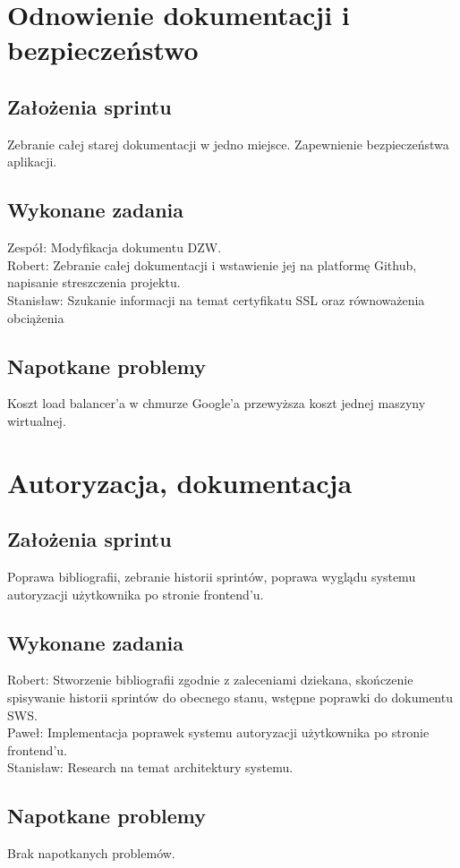 \documentclass[a4paper,11pt]{report}
\begin{document}
\section {Odnowienie dokumentacji i bezpieczeństwo}
\subsection {Założenia sprintu}
Zebranie całej starej dokumentacji w jedno miejsce. Zapewnienie bezpieczeństwa aplikacji.  
\subsection {Wykonane zadania}
Zespół: Modyfikacja dokumentu DZW.\\
Robert: Zebranie całej dokumentacji i wstawienie jej na platformę Github, napisanie streszczenia projektu.\\
Stanisław: Szukanie informacji na temat certyfikatu SSL oraz równoważenia obciążenia\\
\subsection {Napotkane problemy}
Koszt load balancer'a w chmurze Google'a przewyższa koszt jednej maszyny wirtualnej.


\section {Autoryzacja, dokumentacja}
\subsection {Założenia sprintu}
Poprawa bibliografii, zebranie historii sprintów, poprawa wyglądu systemu autoryzacji użytkownika po stronie frontend'u.
\subsection {Wykonane zadania}
Robert: Stworzenie bibliografii zgodnie z zaleceniami dziekana, skończenie spisywanie historii sprintów do obecnego stanu, wstępne poprawki do dokumentu SWS.\\
Paweł: Implementacja poprawek systemu autoryzacji użytkownika po stronie frontend'u.\\
Stanisław: Research na temat architektury systemu.\\
\subsection {Napotkane problemy}
Brak napotkanych problemów.
\end{document}
